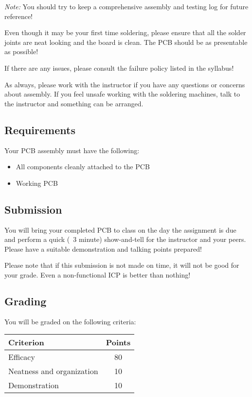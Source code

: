 \emph{Note:} You should try to keep a comprehensive assembly and testing log for future reference!

Even though it may be your first time soldering, please ensure that all the solder joints are neat looking and the board is clean.
The PCB should be as presentable as possible!

If there are any issues, please consult the failure policy listed in the syllabus!

As always, please work with the instructor if you have any questions or concerns about assembly.
If you feel unsafe working with the soldering machines, talk to the instructor and something can be arranged.

    \subsection*{Requirements}
    Your PCB assembly must have the following:
    \begin{itemize}
        \item All components cleanly attached to the PCB
        \item Working PCB
    \end{itemize}

    \subsection*{Submission}
    You will bring your completed PCB to class on the day the assignment is due and perform a quick (~3 minute) show-and-tell for the instructor and your peers.
    Please have a suitable demonstration and talking points prepared!

    Please note that if this submission is not made on time, it will not be good for your grade.
    Even a non-functional ICP is better than nothing!

    \subsection*{Grading}
    You will be graded on the following criteria:

    \begin{table}[h!]
        \begin{tabular}{l | c}
            \toprule
            Criterion & Points \\
            \midrule
            Efficacy & 80 \\
            Neatness and organization & 10 \\
            Demonstration & 10 \\
            \bottomrule
        \end{tabular}
    \end{table}


